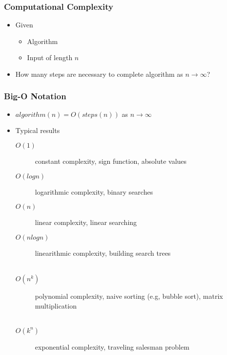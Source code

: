 \begin{frame}
 \frametitle{Computational Complexity}
 \begin{itemize}
  \item Given
   \begin{itemize}
    \item Algorithm
    \item Input of length \( n \)
   \end{itemize}
  \item How many steps are necessary to complete algorithm as \( n \rightarrow \infty \)?
 \end{itemize}
\end{frame}

\begin{frame}
 \frametitle{Big-O Notation}
 \begin{itemize}
  \item \( algorithm(n) = O(steps(n)) \) as \(n \rightarrow \infty \)
  \item Typical results
   \begin{description}
    \item[\(O(1)\)] constant complexity, sign function, absolute values
    \item[\(O(logn)\)] logarithmic complexity, binary searches
    \item[\(O(n)\)] linear complexity, linear searching
    \item[\(O(nlogn)\)] linearithmic complexity, building search trees \\ \hfill \\
    \item[\(O(n^k)\)] polynomial complexity, naive sorting (e.g, bubble sort), matrix multiplication \\ \hfill \\
    \item[\(O(k^n)\)] exponential complexity, traveling salesman problem
   \end{description}
 \end{itemize}
\end{frame}

